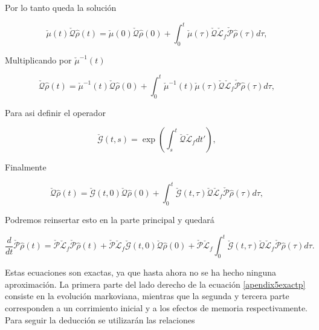 \begin{appendixs}
Por lo tanto queda la solución

\begin{equation*}
    \check{\mu}(t)\check{\mathcal{Q}}\hat{\rho}(t) = \check{\mu}(0)\check{\mathcal{Q}}\hat{\rho}(0) + \int_{0}^{t}\check{\mu}(\tau)\check{\mathcal{Q}}\check{\mathcal{L}}_{f} \check{\mathcal{P}}\hat{\rho}(\tau)d\tau,   
\end{equation*}

Multiplicando por $\check{\mu}^{-1}(t)$ 

\begin{equation*}
    \check{\mathcal{Q}}\hat{\rho}(t) = \check{\mu}^{-1}(t)\check{\mathcal{Q}}\hat{\rho}(0) + \int_{0}^{t}\check{\mu}^{-1}(t)\check{\mu}(\tau)\check{\mathcal{Q}}\check{\mathcal{L}}_{f} \check{\mathcal{P}}\hat{\rho}(\tau)d\tau,    
\end{equation*}

Para asi definir el operador

\begin{equation*}
    \check{\mathcal{G}}(t,s) = \exp\left(  \int_{s}^{t}\check{\mathcal{Q}}\check{\mathcal{L}}_{f}dt' \right),
\end{equation*}

Finalmente

\begin{equation*}
    \check{\mathcal{Q}}\hat{\rho}(t) = \check{\mathcal{G}}(t,0)\check{\mathcal{Q}}\hat{\rho}(0) + \int_{0}^{t}\check{\mathcal{G}}(t,\tau)\check{\mathcal{Q}}\check{\mathcal{L}}_{f} \check{\mathcal{P}}\hat{\rho}(\tau)d\tau,    
\end{equation*}

Podremos reinsertar esto en la parte principal y quedará

\begin{equation}
    \frac{d}{dt}\check{\mathcal{P}}\hat{\rho}(t) = \check{\mathcal{P}}\check{\mathcal{L}}_{f}\check{\mathcal{P}}\hat{\rho}(t) + \check{\mathcal{P}}\check{\mathcal{L}}_{f}\check{\mathcal{G}}(t,0)\check{\mathcal{Q}}\hat{\rho}(0) + \check{\mathcal{P}}\check{\mathcal{L}}_{f}\int_{0}^{t}\check{\mathcal{G}}(t,\tau)\check{\mathcal{Q}}\check{\mathcal{L}}_{f} \check{\mathcal{P}}\hat{\rho}(\tau)d\tau.    
    \label{apendix5exactp}
\end{equation}

Estas ecuaciones son exactas, ya que hasta ahora no se ha hecho ninguna aproximación. La primera parte del lado derecho de la ecuación \ref{apendix5exactp} consiste en la evolución markoviana, mientras que la segunda y  tercera parte corresponden a un corrimiento inicial y a los efectos de memoria respectivamente. Para seguir la deducción se utilizarán las relaciones


\end{appendixs}
